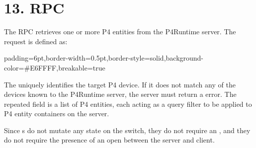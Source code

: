 \documentclass[11pt]{article}
\begin{document}
{%
\section{13.\hspace*{0.5em} RPC}\label{sec-read-rpc}%

\noindent{}The  RPC retrieves one or more P4 entities from the P4Runtime server. The
request is defined as:%

\begin{mdbmargintb}{6pt}{6pt}%
\begin{mdblock}{padding=6pt,border-width=0.5pt,border-style=solid,background-color=\#E6FFFF,breakable=true}%
\begin{mdpre}%
\end{mdpre}%
\end{mdblock}%
\end{mdbmargintb}%

\noindent{}The  uniquely identifies the target P4 device. If it does not match
any of the devices known to the P4Runtime server, the server must return a
 error. The  repeated field is a list of P4 entities, each
acting as a query filter to be applied to P4 entity containers on the server.%

Since s do not mutate any state on the switch, they do not
require an , and they do not require the presence of an open
 between the server and client.%

}
\end{document}
